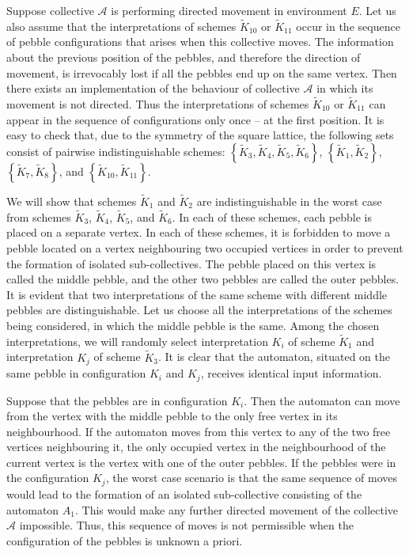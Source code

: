 \documentclass{article}
\newenvironment{proof}[1][Proof]{\begin{trivlist}
\item[\hskip \labelsep {\bfseries #1}]}{\end{trivlist}}
\begin{document}
\begin{proof}
Suppose collective $\mathcal{A}$ is performing directed movement in environment $E$.
Let us also assume that the interpretations of schemes $\widetilde K_{10}$ or $\widetilde K_{11}$ occur in the sequence of pebble configurations that arises when this collective moves.
The information about the previous position of the pebbles, and therefore the direction of movement, is irrevocably lost if all the pebbles end up on the same vertex.
Then there exists an implementation of the behaviour of collective $\mathcal{A}$ in which its movement is not directed. 
Thus the interpretations of schemes $\widetilde K_{10}$ or $\widetilde K_{11}$ can appear in the sequence of configurations only once -- at the first position.
It is easy to check that, due to the symmetry of the square lattice, the following sets consist of pairwise indistinguishable schemes: 
$\left\{ \widetilde K_{3}, \widetilde K_{4}, \widetilde K_{5}, \widetilde K_{6} \right\}$, 
$\left\{ \widetilde K_{1}, \widetilde K_{2} \right\}$,
$\left\{ \widetilde K_{7}, \widetilde K_{8} \right\}$, and $\left\{ \widetilde K_{10}, \widetilde K_{11} \right\}$.

We will show that schemes $\widetilde K_{1}$ and $\widetilde K_{2}$ are indistinguishable in the worst case from schemes $\widetilde K_{3}$, $\widetilde K_{4}$, $\widetilde K_{5}$, and $\widetilde K_{6}$.
In each of these schemes, each pebble is placed on a separate vertex.
In each of these schemes, it is forbidden to move a pebble located on a vertex neighbouring two occupied vertices in order to prevent the formation of isolated sub-collectives.
The pebble placed on this vertex is called the middle pebble, and the other two pebbles are called the outer pebbles.
It is evident that two interpretations of the same scheme with different middle pebbles are distinguishable.
Let us choose all the interpretations of the schemes being considered, in which the middle pebble is the same.
Among the chosen interpretations, we will randomly select interpretation $K_{i}$ of scheme $\widetilde K_{1}$ and interpretation $K_{j}$ of scheme $\widetilde K_{3}$.
It is clear that the automaton, situated on the same pebble in configuration $K_{i}$ and $K_{j}$, receives identical input information.

Suppose that the pebbles are in configuration $K_{i}$. 
Then the automaton can move from the vertex with the middle pebble to the only free vertex in its neighbourhood. 
If the automaton moves from this vertex to any of the two free vertices neighbouring it, the only occupied vertex in the neighbourhood of the current vertex is the vertex with one of the outer pebbles.
If the pebbles were in the configuration $K_{j}$, the worst case scenario is that the same sequence of moves would lead to the formation of an isolated sub-collective consisting of the automaton $A_{1}$. 
This would make any further directed movement of the collective $\mathcal{A}$ impossible.
Thus, this sequence of moves is not permissible when the configuration of the pebbles is unknown a priori.


\end{proof}
\end{document}
